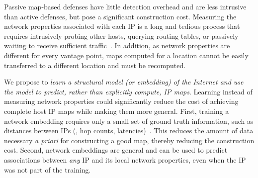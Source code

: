 Passive map-based defenses have little detection overhead and are less intrusive than active defenses, but pose a significant construction cost.
%
Measuring the network properties associated with each IP is a long and tedious process that requires intrusively probing other hosts, querying routing tables, or passively waiting to receive sufficient traffic~\citep{hcf}.
%
In addition, as network properties are different for every vantage point, maps computed for a location cannot be easily transferred to a different location and must be recomputed.

We propose to {\em learn a structural model (or embedding) of the Internet and use the model to predict, rather than explicitly compute, IP maps}. Learning instead of measuring network properties could significantly reduce the cost of achieving complete host IP maps while making them more general. First, training a network embedding requires only a small set of ground truth information, such as distances between IPs (\eg{}, hop counts, latencies)~\citep{vivaldi,peerwise,barford-infocom}. This reduces the amount of data necessary {\em a priori} for constructing a good map, thereby reducing the construction cost. Second, network embeddings are general and can be used to predict associations between {\em any} IP and its local network properties, even when the IP was not part of the training. %











%

%
%
%



